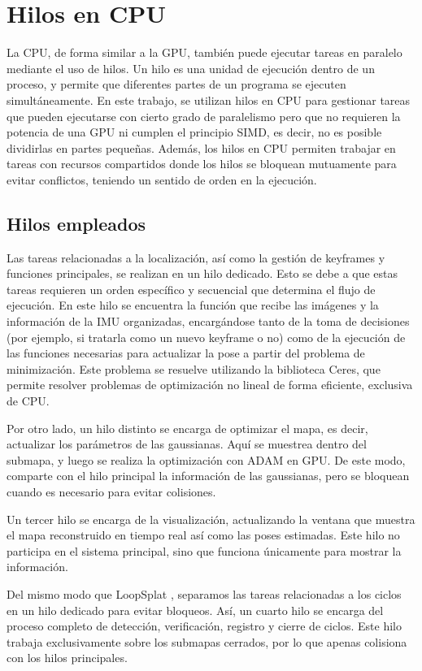 \section{Hilos en CPU}

La CPU, de forma similar a la GPU, también puede ejecutar tareas en paralelo mediante el uso de hilos. Un hilo es una unidad de ejecución dentro de un proceso, y permite que diferentes partes de un programa se ejecuten simultáneamente. En este trabajo, se utilizan hilos en CPU para gestionar tareas que pueden ejecutarse con cierto grado de paralelismo pero que no requieren la potencia de una GPU ni cumplen el principio SIMD, es decir, no es posible dividirlas en partes pequeñas. Además, los hilos en CPU permiten trabajar en tareas con recursos compartidos donde los hilos se bloquean mutuamente para evitar conflictos, teniendo un sentido de orden en la ejecución.

\subsection{Hilos empleados}

Las tareas relacionadas a la localización, así como la gestión de keyframes y funciones principales, se realizan en un hilo dedicado. Esto se debe a que estas tareas requieren un orden específico y secuencial que determina el flujo de ejecución. En este hilo se encuentra la función que recibe las imágenes y la información de la IMU organizadas, encargándose tanto de la toma de decisiones (por ejemplo, si tratarla como un nuevo keyframe o no) como de la ejecución de las funciones necesarias para actualizar la pose a partir del problema de minimización. Este problema se resuelve utilizando la biblioteca Ceres, que permite resolver problemas de optimización no lineal de forma eficiente, exclusiva de CPU.

Por otro lado, un hilo distinto se encarga de optimizar el mapa, es decir, actualizar los parámetros de las gaussianas. Aquí se muestrea dentro del submapa, y luego se realiza la optimización con ADAM en GPU. De este modo, comparte con el hilo principal la información de las gaussianas, pero se bloquean cuando es necesario para evitar colisiones.

Un tercer hilo se encarga de la visualización, actualizando la ventana que muestra el mapa reconstruido en tiempo real así como las poses estimadas. Este hilo no participa en el sistema principal, sino que funciona únicamente para mostrar la información.

Del mismo modo que LoopSplat \cite{zhu2025_loopsplat}, separamos las tareas relacionadas a los ciclos en un hilo dedicado para evitar bloqueos. Así, un cuarto hilo se encarga del proceso completo de detección, verificación, registro y cierre de ciclos. Este hilo trabaja exclusivamente sobre los submapas cerrados, por lo que apenas colisiona con los hilos principales.
